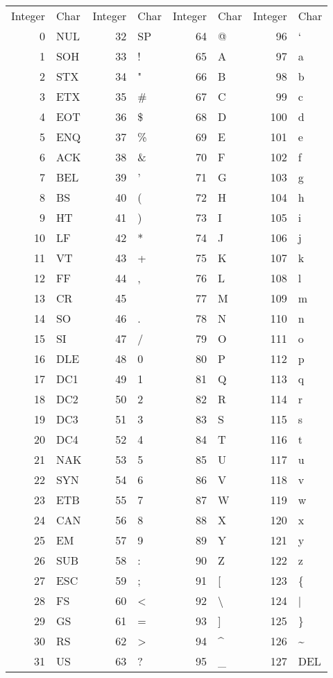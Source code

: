 \begin{table}[h]
\begin{tabular}{rlrlrlrl}
Integer	&	Char	&	Integer	&	Char	&	Integer	&	Char	&	Integer	&	Char \\
0	  &	NUL	&	32	&	SP	&	64	&	@	&	96	&	` \\
1	  &	SOH	&	33	&	!	&	65	&	A	&	97	&	a \\
2	  &	STX	&	34	&	"	&	66	&	B	&	98	&	b \\
3	  &	ETX	&	35	&	#	&	67	&	C	&	99	&	c \\
4	  &	EOT	&	36	&	\$	&	68	&	D	&	100	&	d \\
5	  &	ENQ	&	37	&	\%	&	69	&	E	&	101	&	e \\
6	  &	ACK	&	38	&	\&	&	70	&	F	&	102	&	f \\
7	  &	BEL	&	39	&	'	&	71	&	G	&	103	&	g \\
8	  &	BS	&	40	&	(	&	72	&	H	&	104	&	h \\
9	  &	HT	&	41	&	)	&	73	&	I	&	105	&	i \\
10	&	LF	&	42	&	*	&	74	&	J	&	106	&	j \\
11	&	VT	&	43	&	+	&	75	&	K	&	107	&	k \\
12	&	FF	&	44	&	,	&	76	&	L	&	108	&	l \\
13	&	CR	&	45	&	\-	&	77	&	M	&	109	&	m \\
14	&	SO	&	46	&	.	&	78	&	N	&	110	&	n \\
15	&	SI	&	47	&	/	&	79	&	O	&	111	&	o \\
16	&	DLE	&	48	&	0	&	80	&	P	&	112	&	p \\
17	&	DC1	&	49	&	1	&	81	&	Q	&	113	&	q \\
18	&	DC2	&	50	&	2	&	82	&	R	&	114	&	r \\
19	&	DC3	&	51	&	3	&	83	&	S	&	115	&	s \\
20	&	DC4	&	52	&	4	&	84	&	T	&	116	&	t \\
21	&	NAK	&	53	&	5	&	85	&	U	&	117	&	u \\
22	&	SYN	&	54	&	6	&	86	&	V	&	118	&	v \\
23	&	ETB	&	55	&	7	&	87	&	W	&	119	&	w \\
24	&	CAN	&	56	&	8	&	88	&	X	&	120	&	x \\
25	&	EM	&	57	&	9	&	89	&	Y	&	121	&	y \\
26	&	SUB	&	58	&	:	&	90	&	Z	&	122	&	z \\
27	&	ESC	&	59	&	;	&	91	&	[	&	123	&	\{ \\
28	&	FS	&	60	&	<	&	92	&	\textbackslash	&	124	&	| \\
29	&	GS	&	61	&	=	&	93	&	]	&	125	&	\} \\
30	&	RS	&	62	&	>	&	94	&	\textasciicircum	&	126	&	\textasciitilde \\
31	&	US	&	63	&	?	&	95	&	_	&	127	&	DEL \\
\end{tabular}
\end{table}